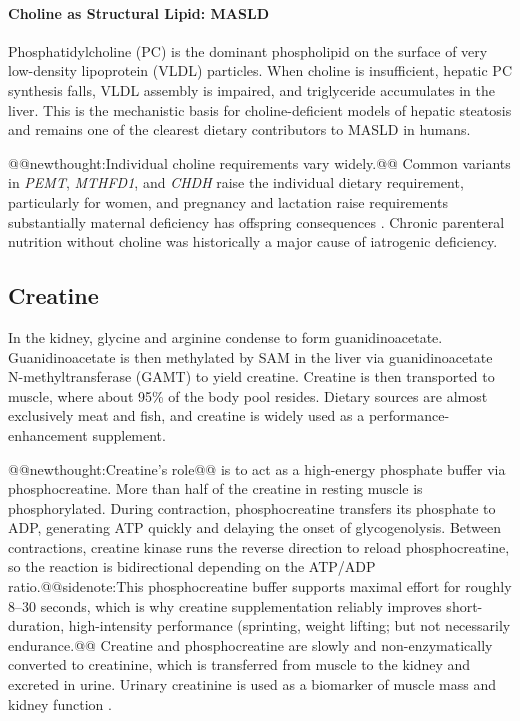 \documentclass{tufte-handout}
\makeatletter
\def\newthought#1{@@newthought:#1@@}
\def\sidenote#1{@@sidenote:#1@@}
\makeatother
\begin{document}
\paragraph{Choline as Structural Lipid: MASLD}
Phosphatidylcholine (PC) is the dominant phospholipid on the surface of very low-density lipoprotein (VLDL) particles. When choline is insufficient, hepatic PC synthesis falls, VLDL assembly is impaired, and triglyceride accumulates in the liver. This is the mechanistic basis for choline-deficient models of hepatic steatosis and remains one of the clearest dietary contributors to MASLD in humans.

\newthought{Individual choline requirements vary widely.}  Common variants in \emph{PEMT}, \emph{MTHFD1}, and \emph{CHDH} raise the individual dietary requirement, particularly for women, and pregnancy and lactation raise requirements substantially maternal deficiency has offspring consequences \citep{craciunescuDietaryCholineReverses2010}. Chronic parenteral nutrition without choline was historically a major cause of iatrogenic deficiency.

\subsection{Creatine}
In the kidney, glycine and arginine condense to form guanidinoacetate. Guanidinoacetate is then methylated by SAM in the liver via guanidinoacetate N-methyltransferase (GAMT) to yield creatine. Creatine is then transported to muscle, where about 95\% of the body pool resides. Dietary sources are almost exclusively meat and fish, and creatine is widely used as a performance-enhancement supplement.

\newthought{Creatine's role} is to act as a high-energy phosphate buffer via phosphocreatine. More than half of the creatine in resting muscle is phosphorylated. During contraction, phosphocreatine transfers its phosphate to ADP, generating ATP quickly and delaying the onset of glycogenolysis. Between contractions, creatine kinase runs the reverse direction to reload phosphocreatine, so the reaction is bidirectional depending on the ATP/ADP ratio.\sidenote{This phosphocreatine buffer supports maximal effort for roughly 8--30 seconds, which is why creatine supplementation reliably improves short-duration, high-intensity performance (sprinting, weight lifting; but not necessarily endurance.} Creatine and phosphocreatine are slowly and non-enzymatically converted to creatinine, which is transferred from muscle to the kidney and excreted in urine. Urinary creatinine is used as a biomarker of muscle mass and kidney function \citep{kreiderInternationalSocietySports2017}.
\end{document}
